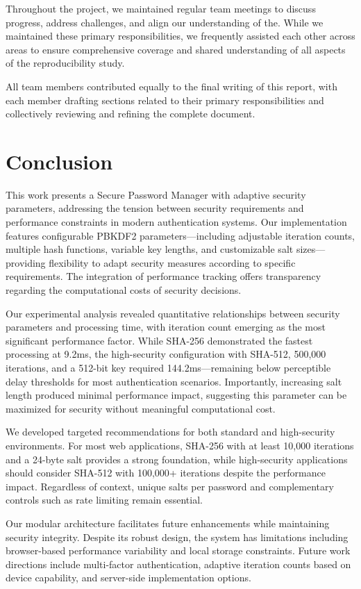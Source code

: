 \documentclass[11pt,a4paper]{article}
\begin{document}
Throughout the project, we maintained regular team meetings to discuss progress, address challenges, and align our understanding of the. While we maintained these primary responsibilities, we frequently assisted each other across areas to ensure comprehensive coverage and shared understanding of all aspects of the reproducibility study.

All team members contributed equally to the final writing of this report, with each member drafting sections related to their primary responsibilities and collectively reviewing and refining the complete document.

\section{Conclusion}
This work presents a Secure Password Manager with adaptive security parameters, addressing the tension between security requirements and performance constraints in modern authentication systems. Our implementation features configurable PBKDF2 parameters—including adjustable iteration counts, multiple hash functions, variable key lengths, and customizable salt sizes—providing flexibility to adapt security measures according to specific requirements. The integration of performance tracking offers transparency regarding the computational costs of security decisions.

Our experimental analysis revealed quantitative relationships between security parameters and processing time, with iteration count emerging as the most significant performance factor. While SHA-256 demonstrated the fastest processing at 9.2ms, the high-security configuration with SHA-512, 500,000 iterations, and a 512-bit key required 144.2ms—remaining below perceptible delay thresholds for most authentication scenarios. Importantly, increasing salt length produced minimal performance impact, suggesting this parameter can be maximized for security without meaningful computational cost.

We developed targeted recommendations for both standard and high-security environments. For most web applications, SHA-256 with at least 10,000 iterations and a 24-byte salt provides a strong foundation, while high-security applications should consider SHA-512 with 100,000+ iterations despite the performance impact. Regardless of context, unique salts per password and complementary controls such as rate limiting remain essential.

Our modular architecture facilitates future enhancements while maintaining security integrity. Despite its robust design, the system has limitations including browser-based performance variability and local storage constraints. Future work directions include multi-factor authentication, adaptive iteration counts based on device capability, and server-side implementation options.
\end{document}
